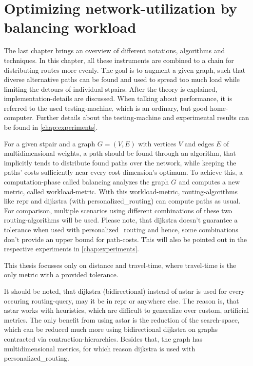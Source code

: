 \chapter{Optimizing network-utilization by balancing workload}
\label{chap:balancing}

The last chapter brings an overview of different notations, algorithms and techniques.
In this chapter, all these instruments are combined to a chain for distributing routes more evenly.
The goal is to augment a given graph, such that diverse alternative paths can be found and used to spread too much load while limiting the detours of individual \glspl{stpair}.
After the theory is explained, implementation-details are discussed.
When talking about performance, it is referred to the used testing-machine, which is an ordinary, but good home-computer.
Further details about the testing-machine and experimental results can be found in \vref{chap:experiments}.

For a given \gls{stpair} and a graph $G = (V, E)$ with vertices $V$ and edges $E$ of multidimensional \glspl{weight}, a path should be found through an algorithm, that implicitly tends to distribute found paths over the network, while keeping the paths' \glspl{cost} sufficiently near every \gls{cost}-dimension's optimum.
To achieve this, a computation-phase called \gls{balancing} analyzes the graph $G$ and computes a new \gls{metric}, called workload-\gls{metric}.
With this workload-\gls{metric}, routing-algorithms like \gls{repr} and \gls{dijkstra} (with \gls{personalized_routing}) can compute paths as usual.
For comparison, multiple scenarios using different combinations of these two routing-algorithms will be used.
Please note, that \gls{dijkstra} doesn't guarantee a tolerance when used with \gls{personalized_routing} and hence, some combinations don't provide an upper bound for path-costs.
This will also be pointed out in the respective experiments in \vref{chap:experiments}.

This thesis focusses only on distance and travel-time, where travel-time is the only \gls{metric} with a provided tolerance.

It should be noted, that \gls{dijkstra} (bidirectional) instead of \gls{astar} is used for every occuring routing-query, may it be in \gls{repr} or anywhere else.
The reason is, that \gls{astar} works with heuristics, which are difficult to generalize over custom, artificial \glspl{metric}.
The only benefit from using \gls{astar} is the reduction of the search-space, which can be reduced much more using bidirectional \gls{dijkstra} on graphs contracted via \gls{contraction-hierarchies}.
Besides that, the graph has multidimensional \glspl{metric}, for which reason \gls{dijkstra} is used with \gls{personalized_routing}.

